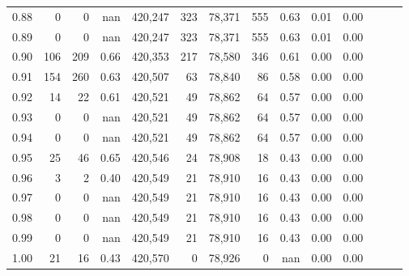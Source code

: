 \begin{tabular}{rrrrrrrrrrrrrr}
0.88 &       0 &      0 &   nan &  420,247 &      323 &  78,371 &     555 &  0.63 &  0.01 &      0.00 \\
0.89 &       0 &      0 &   nan &  420,247 &      323 &  78,371 &     555 &  0.63 &  0.01 &      0.00 \\
0.90 &     106 &    209 &  0.66 &  420,353 &      217 &  78,580 &     346 &  0.61 &  0.00 &      0.00 \\
0.91 &     154 &    260 &  0.63 &  420,507 &       63 &  78,840 &      86 &  0.58 &  0.00 &      0.00 \\
0.92 &      14 &     22 &  0.61 &  420,521 &       49 &  78,862 &      64 &  0.57 &  0.00 &      0.00 \\
0.93 &       0 &      0 &   nan &  420,521 &       49 &  78,862 &      64 &  0.57 &  0.00 &      0.00 \\
0.94 &       0 &      0 &   nan &  420,521 &       49 &  78,862 &      64 &  0.57 &  0.00 &      0.00 \\
0.95 &      25 &     46 &  0.65 &  420,546 &       24 &  78,908 &      18 &  0.43 &  0.00 &      0.00 \\
0.96 &       3 &      2 &  0.40 &  420,549 &       21 &  78,910 &      16 &  0.43 &  0.00 &      0.00 \\
0.97 &       0 &      0 &   nan &  420,549 &       21 &  78,910 &      16 &  0.43 &  0.00 &      0.00 \\
0.98 &       0 &      0 &   nan &  420,549 &       21 &  78,910 &      16 &  0.43 &  0.00 &      0.00 \\
0.99 &       0 &      0 &   nan &  420,549 &       21 &  78,910 &      16 &  0.43 &  0.00 &      0.00 \\
1.00 &      21 &     16 &  0.43 &  420,570 &        0 &  78,926 &       0 &   nan &  0.00 &      0.00 \\
\bottomrule
\end{tabular}
